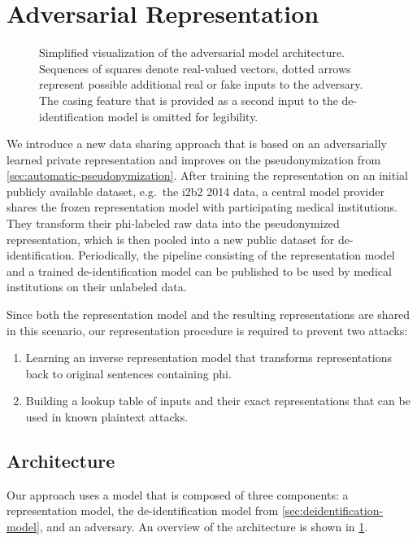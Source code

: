 \section{Adversarial Representation}\label{sec:adversarial-representation}

\begin{figure}
    \centering
    
    \caption[Adversarial model architecture]{%
        Simplified visualization of the adversarial model architecture.
        Sequences of squares denote real-valued vectors, dotted arrows represent possible additional real or fake inputs to the adversary.
        The casing feature that is provided as a second input to the de-identification model is omitted for legibility.}\label{fig:adversarial-model}
\end{figure}

%
We introduce a new data sharing approach that is based on an adversarially learned private representation and improves on the pseudonymization from \cref{sec:automatic-pseudonymization}.
%
After training the representation on an initial publicly available dataset, e.g.\ the i2b2 2014 data, a central model provider shares the frozen representation model with participating medical institutions.
%
They transform their \ac{phi}-labeled raw data into the pseudonymized representation, which is then pooled into a new public dataset for de-identification.
%
Periodically, the pipeline consisting of the representation model and a trained de-identification model can be published to be used by medical institutions on their unlabeled data.

%
Since both the representation model and the resulting representations are shared in this scenario, our representation procedure is required to prevent two attacks:
%
\begin{enumerate}[label=A\arabic*.,ref=A\arabic*]
    \item Learning an inverse representation model that transforms representations back to original sentences containing \ac{phi}.\label{item:attack1}
    \item Building a lookup table of inputs and their exact representations that can be used in known plaintext attacks.\label{item:attack2}
\end{enumerate}

\subsection{Architecture}
%
Our approach uses a model that is composed of three components: a representation model, the de-identification model from \cref{sec:deidentification-model}, and an adversary.
%
An overview of the architecture is shown in \cref{fig:adversarial-model}.

